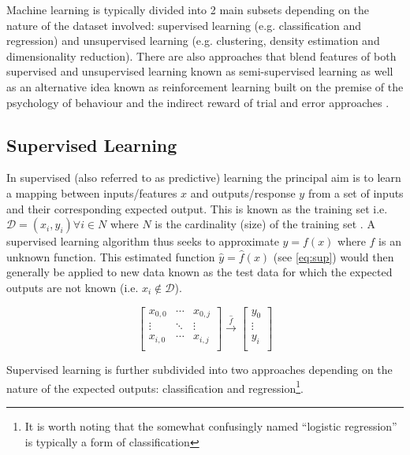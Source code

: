 Machine learning is typically divided into 2 main subsets depending on the nature of the dataset involved: 
supervised learning (e.g. classification and regression) and unsupervised learning (e.g. clustering,
density estimation and dimensionality reduction).
There are also approaches that blend features of both supervised and unsupervised learning known as semi-supervised
learning as well as an alternative idea known as reinforcement learning built on the premise of the psychology
of behaviour and the indirect reward of trial and error approaches \citep{Bishop2006}.



\subsection{Supervised Learning}

In supervised (also referred to as predictive) learning the principal aim is 
to learn a mapping between inputs/features \(x\) and outputs/response \(y\) from a set of 
inputs and their corresponding expected output.  This is known as the training set 
i.e. \(\mathcal{D} = {(x_{i}, y_{i}) \forall i \in N}\) where \(N\) is 
the cardinality (size) of the training set \citep{Murphy2012}.  
A supervised learning algorithm thus seeks to approximate \(y=f(x)\) where \(f\) is an unknown 
function. This estimated function \(\hat{y} = \hat{f}(x)\) (see \ref{eq:sup}) would then generally
be applied to new data known as the test data for which the expected outputs are not known (i.e. 
\(x_{i} \not \in \mathcal{D}\)).

\[
    \begin{bmatrix}
        x_{0,0} & \cdots & x_{0,j}\\
        \vdots & \ddots & \vdots \\
        x_{i,0} & \cdots & x_{i,j}\\
    \end{bmatrix} \overset{\hat{f}}{\rightarrow} \begin{bmatrix}
        y_{0} \\
        \vdots \\
        y_{i} \\
    \end{bmatrix}
    \label{eq:sup}
\]

Supervised learning is further subdivided into two approaches depending on the nature of the expected
outputs: classification and regression\footnote{It is worth noting that the somewhat confusingly named
    ``logistic regression'' is typically a form of classification}.


